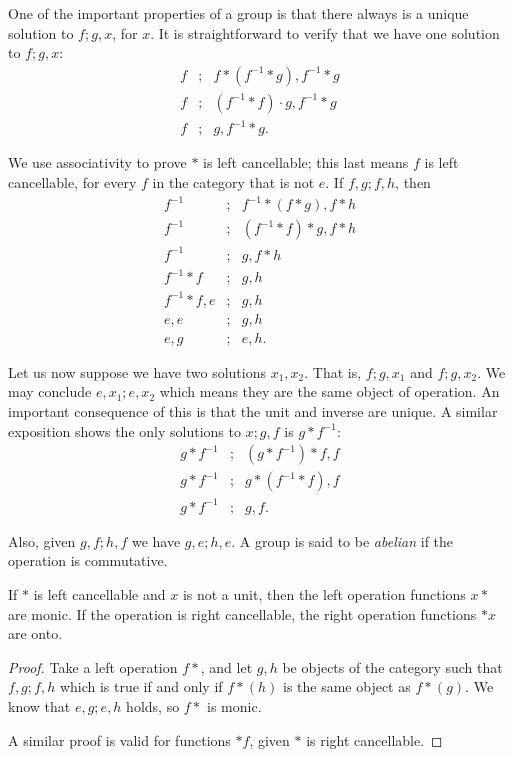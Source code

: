 \documentclass [12pt]{book}
\begin{document}
One of the important properties of a group is that there always is a unique solution to $f;g,x$, for $x$. It is straightforward to verify that we have one solution to $f;g,x$:
\begin{eqnarray}\nonumber f&;&f*(f^{-1}*g),f^{-1}*g\\\nonumber f&;&(f^{-1}*f)\cdot g,f^{-1}*g\\\nonumber f&;&g,f^{-1}*g.\end{eqnarray}

We use associativity to prove $*$ is left cancellable; this last means $f$ is left cancellable, for every $f$ in the category that is not $e$. If $f,g;f,h$, then
\begin{eqnarray}\nonumber f^{-1}&;&f^{-1}*(f*g),f*h\\\nonumber f^{-1}&;&(f^{-1}*f)*g,f*h\\\nonumber f^{-1}&;&g,f*h\\\nonumber f^{-1}*f&;&g,h\\\nonumber f^{-1}*f,e&;&g,h\\\nonumber e,e&;&g,h\\\nonumber e,g&;&e,h.\end{eqnarray}

Let us now suppose we have two solutions $x_{1},x_{2}$. That is, $f;g,x_{1}$ and $f;g,x_{2}$. We may conclude $e,x_{1};e,x_{2}$ which means they are the same object of operation. An important consequence of this is that the unit and inverse are unique. A similar exposition shows the only solutions to $x;g,f$ is $g*f^{-1}$:
\begin{eqnarray}\nonumber g*f^{-1}&;&(g*f^{-1})*f,f\\\nonumber g*f^{-1}&;&g*(f^{-1}*f),f\\\nonumber g*f^{-1}&;&g,f.\end{eqnarray}

Also, given $g,f;h,f$ we have $g,e;h,e$. A group is said to be \textit{abelian} if the operation is commutative.

\begin{proposition}If $*$ is left cancellable and $x$ is not a unit, then the left operation functions $x*$ are monic. If the operation is right cancellable, the right operation functions $*x$ are onto.\end{proposition}

\begin{proof}Take a left operation $f*$, and let $g,h$ be objects of the category such that $f,g;f,h$ which is true if and only if $f*(h)$ is the same object as $f*(g)$. We know that $e,g;e,h$ holds, so $f*$ is monic.

A similar proof is valid for functions $*f$, given $*$ is right cancellable.\end{proof}
\end{document}
